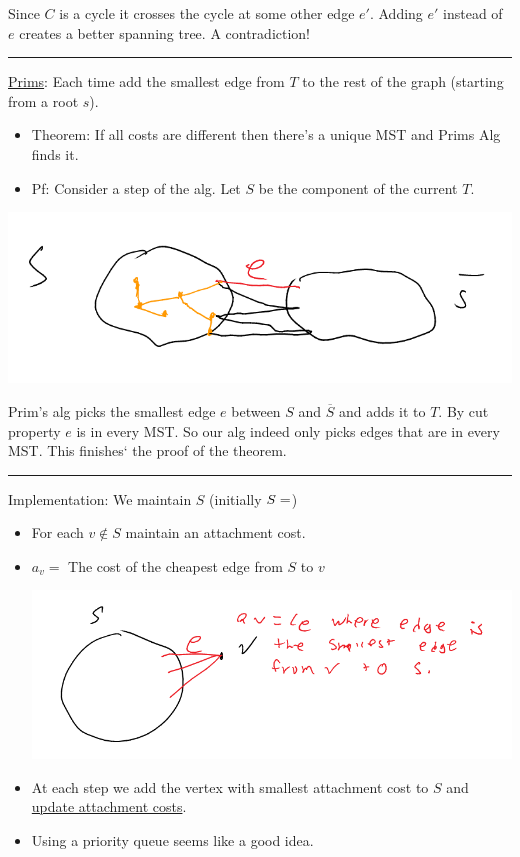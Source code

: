 \documentclass[11pt]{article}
\begin{document}
Since \(C\) is a cycle it crosses the cycle at some other edge \(e'\). Adding \(e'\) instead of \(e\) creates a better spanning tree. A contradiction!

\noindent\rule{\textwidth}{0.5pt}
\uline{Prims}: Each time add the smallest edge from \(T\) to the rest of the graph (starting from a root \(s\)).
\begin{itemize}
\item Theorem: If all costs are different then there's a unique MST and Prims Alg finds it.
\item Pf: Consider a step of the alg. Let \(S\) be the component of the current \(T\).
\end{itemize}
\begin{center}
\includegraphics[width=.9\linewidth]{./Images/i51.png}
\end{center}
Prim's alg picks the smallest edge \uline{\(e\)} between \(S\) and \(\overline{S}\) and adds it to \(T\). By cut property \(e\) is in every MST. So our alg indeed only picks edges that are in every MST. This finishes` the proof of the theorem. 

\noindent\rule{\textwidth}{0.5pt}
Implementation: We maintain \(S\) (initially \(S=\empty\))
\begin{itemize}
\item For each \(v \notin S\) maintain an attachment cost.
\item \(a_v =\) The cost of the cheapest edge from \(S\) to \(v\)
\begin{center}
\includegraphics[width=.9\linewidth]{./Images/i52.png}
\end{center}
\item At each step we add the vertex with smallest attachment cost to \(S\) and \uline{update attachment costs}.
\item Using a priority queue seems like a good idea.
\end{itemize}
\end{document}
